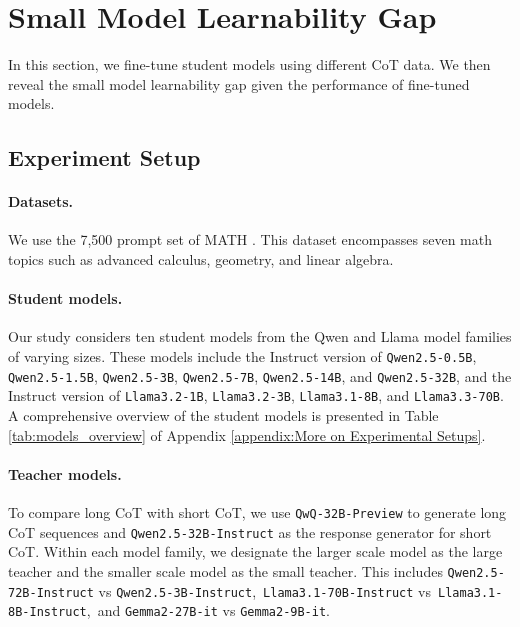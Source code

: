 \section{Small Model Learnability Gap}
\label{sec: empirical}
In this section, we fine-tune student models using different CoT data. 
We then reveal the small model learnability gap given the performance of fine-tuned models.

\subsection{Experiment Setup}

\paragraph{Datasets.}
We use the 7,500 prompt set of MATH \citep{hendrycks2021measuringmathematicalproblemsolving}. This dataset encompasses seven math topics such as advanced calculus, geometry, and linear algebra. 





\paragraph{Student models.}
Our study considers ten student models from the Qwen \citep{qwen2.5} and Llama \citep{llama32,llama31} model families of varying sizes. These models include the Instruct version of \texttt{Qwen2.5-0.5B}, \texttt{Qwen2.5-1.5B}, \texttt{Qwen2.5-3B}, \texttt{Qwen2.5-7B}, \texttt{Qwen2.5-14B}, and \texttt{Qwen2.5-32B}, and the Instruct version of \texttt{Llama3.2-1B}, \texttt{Llama3.2-3B}, \texttt{Llama3.1-8B}, and \texttt{Llama3.3-70B}. A comprehensive overview of the student models is presented in Table \ref{tab:models_overview} of Appendix \ref{appendix:More on Experimental Setups}. 


\paragraph{Teacher models.} 


To compare long CoT with short CoT, we use \texttt{QwQ-32B-Preview} \citep{QwenTeam2024b} to generate long CoT sequences and \texttt{Qwen2.5-32B-Instruct} as the response generator for short CoT. 
Within each model family, we designate the larger scale model as the large teacher and the smaller scale model as the small teacher. 
This includes \texttt{Qwen2.5-72B-Instruct} vs \texttt{Qwen2.5-\allowdisplaybreaks3B-Instruct},~\texttt{Llama3.1-70B-Instruct} vs~\texttt{Llama3.1-8B-Instruct},~and \texttt{Gemma2-27B-it} vs \texttt{Gemma2-9B-it}.



